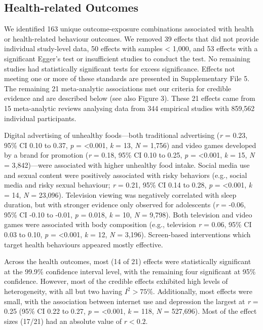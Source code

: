 \documentclass[
  english,
  man]{apa6}
\begin{document}
\hypertarget{health-related-outcomes}{%
\subsection{Health-related Outcomes}\label{health-related-outcomes}}

We identified 163 unique outcome-exposure combinations associated with health or health-related behaviour outcomes.
We removed 39 effects that did not provide individual study-level data, 50 effects with samples \textless{} 1,000, and 53 effects with a significant Egger's test or insufficient studies to conduct the test.
No remaining studies had statistically significant tests for excess significance.
Effects not meeting one or more of these standards are presented in Supplementary File 5.
The remaining 21 meta-analytic associations met our criteria for credible evidence and are described below (see also Figure 3).
These 21 effects came from 15 meta-analytic reviews analysing data from 344 empirical studies with 859,562 individual participants.

Digital advertising of unhealthy foods---both traditional advertising (\emph{r} = 0.23, 95\% CI 0.10 to 0.37, \emph{p} = \textless0.001, \emph{k} = 13, \emph{N} = 1,756) and video games developed by a brand for promotion (\emph{r} = 0.18, 95\% CI 0.10 to 0.25, \emph{p} = \textless0.001, \emph{k} = 15, \emph{N} = 3,842)---were associated with higher unhealthy food intake.
Social media use and sexual content were positively associated with risky behaviors (e.g., social media and risky sexual behaviour; \emph{r} = 0.21, 95\% CI 0.14 to 0.28, \emph{p} = \textless0.001, \emph{k} = 14, \emph{N} = 23,096).
Television viewing was negatively correlated with sleep duration, but with stronger evidence only observed for adolescents (\emph{r} = -0.06, 95\% CI -0.10 to -0.01, \emph{p} = 0.018, \emph{k} = 10, \emph{N} = 9,798).
Both television and video games were associated with body composition (e.g., television \emph{r} = 0.06, 95\% CI 0.03 to 0.10, \emph{p} = \textless0.001, \emph{k} = 12, \emph{N} = 3,196).
Screen-based interventions which target health behaviours appeared mostly effective.

Across the health outcomes, most (14 of 21) effects were statistically significant at the 99.9\% confidence interval level, with the remaining four significant at 95\% confidence.
However, most of the credible effects exhibited high levels of heterogeneity, with all but two having \(I^2 > 75\%\).
Additionally, most effects were small, with the association between internet use and depression the largest at \emph{r} = 0.25 (95\% CI 0.22 to 0.27, \emph{p} = \textless0.001, \emph{k} = 118, \emph{N} = 527,696).
Most of the effect sizes (17/21) had an absolute value of \(r < 0.2\).
\end{document}
